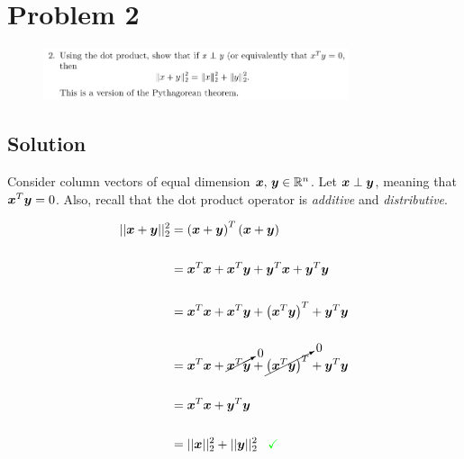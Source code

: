 
\begingroup
\allowdisplaybreaks

\newpage
\section{Problem 2}

\begin{figure}[h]
	\centering
	\includegraphics[width=0.8\textwidth]{./images/prob2_statement.png}
\end{figure}

\subsection{Solution}

Consider column vectors of equal dimension $\boldsymbol{x},\,\boldsymbol{y} \in \mathbb{R}^{n}$. Let $\boldsymbol{x} \perp \boldsymbol{y}$, meaning that $\boldsymbol{x}^T \boldsymbol{y} = 0$. Also, recall that the dot product operator is \textit{additive} and \textit{distributive}.

\begin{align*}
	|| {\boldsymbol{x} + \boldsymbol{y}} ||_2^2 &= \left(\boldsymbol{x} + \boldsymbol{y}\right)^T \left(\boldsymbol{x} + \boldsymbol{y}\right) \\
	\\
	&= \boldsymbol{x}^T\boldsymbol{x} + \boldsymbol{x}^T\boldsymbol{y} + \boldsymbol{y}^T\boldsymbol{x} + \boldsymbol{y}^T\boldsymbol{y} \\
	\\
	&= \boldsymbol{x}^T\boldsymbol{x} + \boldsymbol{x}^T\boldsymbol{y} + \left(\boldsymbol{x}^T\boldsymbol{y}\right)^T +\boldsymbol{y}^T\boldsymbol{y} \\
	\\
	&= \boldsymbol{x}^T\boldsymbol{x} + \cancelto{0}{\boldsymbol{x}^T\boldsymbol{y}} + \cancelto{0}{\left(\boldsymbol{x}^T\boldsymbol{y}\right)^T} + \boldsymbol{y}^T\boldsymbol{y} \\
	\\
	&= \boldsymbol{x}^T\boldsymbol{x} + \boldsymbol{y}^T\boldsymbol{y} \\
	\\
	&= || {\boldsymbol{x}} ||_2^2 + || {\boldsymbol{y}} ||_2^2 \,\,\,\,\, \textcolor{green}{\checkmark}
\end{align*}



